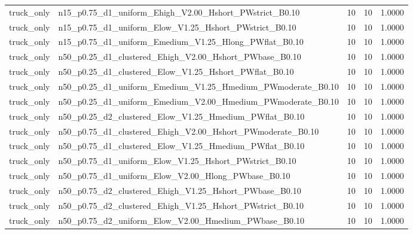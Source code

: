 \begin{tabular}{llrrr}
truck_only & n15_p0.75_d1_uniform_Ehigh_V2.00_Hshort_PWstrict_B0.10 & 10 & 10 & 1.0000 \\
truck_only & n15_p0.75_d1_uniform_Elow_V1.25_Hshort_PWstrict_B0.10 & 10 & 10 & 1.0000 \\
truck_only & n15_p0.75_d1_uniform_Emedium_V1.25_Hlong_PWflat_B0.10 & 10 & 10 & 1.0000 \\
truck_only & n50_p0.25_d1_clustered_Ehigh_V2.00_Hshort_PWbase_B0.10 & 10 & 10 & 1.0000 \\
truck_only & n50_p0.25_d1_clustered_Elow_V1.25_Hshort_PWflat_B0.10 & 10 & 10 & 1.0000 \\
truck_only & n50_p0.25_d1_uniform_Emedium_V1.25_Hmedium_PWmoderate_B0.10 & 10 & 10 & 1.0000 \\
truck_only & n50_p0.25_d1_uniform_Emedium_V2.00_Hmedium_PWmoderate_B0.10 & 10 & 10 & 1.0000 \\
truck_only & n50_p0.25_d2_clustered_Elow_V1.25_Hmedium_PWflat_B0.10 & 10 & 10 & 1.0000 \\
truck_only & n50_p0.75_d1_clustered_Ehigh_V2.00_Hshort_PWmoderate_B0.10 & 10 & 10 & 1.0000 \\
truck_only & n50_p0.75_d1_clustered_Elow_V1.25_Hmedium_PWflat_B0.10 & 10 & 10 & 1.0000 \\
truck_only & n50_p0.75_d1_uniform_Elow_V1.25_Hshort_PWstrict_B0.10 & 10 & 10 & 1.0000 \\
truck_only & n50_p0.75_d1_uniform_Elow_V2.00_Hlong_PWbase_B0.10 & 10 & 10 & 1.0000 \\
truck_only & n50_p0.75_d2_clustered_Ehigh_V1.25_Hshort_PWbase_B0.10 & 10 & 10 & 1.0000 \\
truck_only & n50_p0.75_d2_clustered_Ehigh_V1.25_Hshort_PWstrict_B0.10 & 10 & 10 & 1.0000 \\
truck_only & n50_p0.75_d2_uniform_Elow_V2.00_Hmedium_PWbase_B0.10 & 10 & 10 & 1.0000 \\
\bottomrule
\end{tabular}
